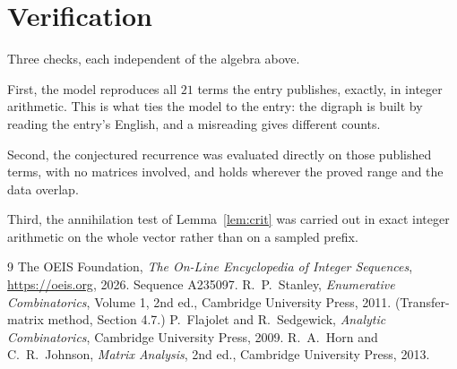 \documentclass[11pt,a4paper]{article}
\theoremstyle{plain}
\theoremstyle{definition}
\begin{document}
\section{Verification}

Three checks, each independent of the algebra above.

First, the model reproduces all $21$ terms the entry publishes, exactly, in integer
arithmetic. This is what ties the model to the entry: the digraph is built by reading the
entry's English, and a misreading gives different counts.

Second, the conjectured recurrence was evaluated directly on those published terms, with no
matrices involved, and holds wherever the proved range and the data overlap.

Third, the annihilation test of Lemma~\ref{lem:crit} was carried out in exact integer
arithmetic on the whole vector rather than on a sampled prefix.

\begin{thebibliography}{9}
 The OEIS Foundation, \emph{The On-Line Encyclopedia of Integer
Sequences}, \url{https://oeis.org}, 2026. Sequence A235097.
 R.~P.~Stanley, \emph{Enumerative Combinatorics}, Volume 1, 2nd ed.,
Cambridge University Press, 2011. (Transfer-matrix method, Section 4.7.)
 P.~Flajolet and R.~Sedgewick, \emph{Analytic Combinatorics}, Cambridge
University Press, 2009.
 R.~A.~Horn and C.~R.~Johnson, \emph{Matrix Analysis}, 2nd ed., Cambridge
University Press, 2013.
\end{thebibliography}
\end{document}
